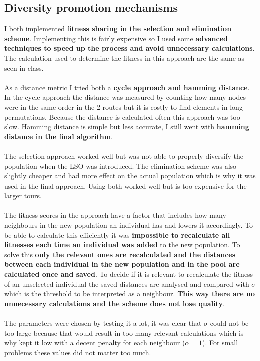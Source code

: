 \documentclass[a4paper,10pt]{article}
\begin{document}
\subsection{Diversity promotion mechanisms}
\label{dpm}
I both implemented \textbf{fitness sharing in the selection and elimination scheme}. Implementing this is fairly expensive so I used some \textbf{advanced techniques to speed up the process and avoid unnecessary calculations}. The calculation used to determine the fitness in this approach are the same as seen in class.
\\\\
As a distance metric I tried both a \textbf{cycle approach and hamming distance}. In the cycle approach the distance was measured by counting how many nodes were in the same order in the 2 routes but it is costly to find elements in long permutations. Because the distance is calculated often this approach was too slow. Hamming distance is simple but less accurate, I still went with \textbf{hamming distance in the final algorithm}.
\\\\
The selection approach worked well but was not able to properly diversify the population when the LSO was introduced. The elimination scheme was also slightly cheaper and had more effect on the actual population which is why it was used in the final approach. Using both worked well but is too expensive for the larger tours.
\\\\
The fitness scores in the approach have a factor that includes how many neighbours in the new population an individual has and lowers it accordingly. To be able to calculate this efficiently it was \textbf{impossible to recalculate all fitnesses each time an individual was added} to the new population. To solve this \textbf{only the relevant ones are recalculated and the distances between each individual in the new population and in the pool are calculated once and saved}. To decide if it is relevant to recalculate the fitness of an unselected individual the saved distances are analysed and compared with $\sigma$ which is the threshold to be interpreted as a neighbour. \textbf{This way there are no unnecessary calculations and the scheme does not lose quality}.
\\\\
The parameters were chosen by testing it a lot, it was clear that $\sigma$ could not be too large because that would result in too many relevant calculations which is why  kept it low with a decent penalty for each neighbour ($\alpha = 1$). For small problems these values did not matter too much.
\end{document}
